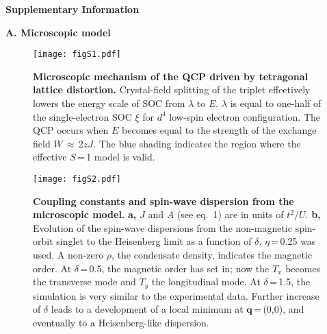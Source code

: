 \documentclass[twocolumn,prb,aps,showpacs]{revtex4-1}
\begin{document}
\newpage
\noindent 
{\bf Supplementary Information}

\vspace{20 pt}
\noindent
{\bf A. Microscopic model}

\vspace{10 pt}
\noindent

\begin{figure}[b]
\texttt{[image: figS1.pdf]}
\setcounter{figure}{0}
\renewcommand{\thefigure}{S\arabic{figure}}
\caption{{\bf Microscopic mechanism of the QCP driven by tetragonal lattice distortion.} Crystal-field splitting of the triplet effectively lowers the energy scale of SOC from $\lambda$ to $E$. $\lambda$ is equal to one-half of the single-electron SOC $\xi$ for $d^4$ low-spin electron configuration. The QCP occurs when $E$ becomes equal to the strength of the exchange field $W$\,$\approx$\,2$zJ$. The blue shading indicates the region where the effective $S$\,=\,1 model is valid. }
\end{figure}


\begin{figure}[b]
\texttt{[image: figS2.pdf]}
\renewcommand{\thefigure}{S\arabic{figure}}
\caption{{\bf Coupling constants and spin-wave dispersion from the microscopic model.} {\bf a,} $J$ and $A$ (see eq.~1) are in units of $t^2/U$. {\bf b,} Evolution of the spin-wave dispersions from the non-magnetic spin-orbit singlet to the Heisenberg limit as a function of $\delta$. $\eta$\,=\,0.25 was used. A non-zero $\rho$, the condensate density, indicates the magnetic order. At $\delta$\,=\,0.5, the magnetic order has set in; now the $T_x$ becomes the transverse mode and $T_y$ the longitudinal mode. At $\delta$\,=\,1.5, the simulation is very similar to the experimental data. Further increase of $\delta$ leads to a development of a local minimum at $\mathbf{q}$\,=\,(0,0), and eventually to a Heisenberg-like dispersion.}\label{fig:fig1}
\end{figure}
\end{document}
